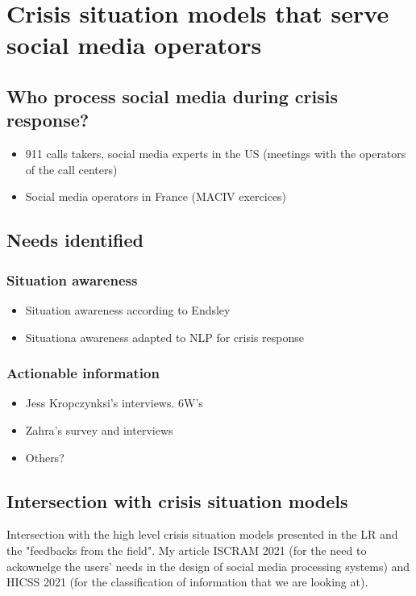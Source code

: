 \chapter{Crisis situation models that serve social media operators}

\section{Who process social media during crisis response?}
\begin{itemize}
    \item 911 calls takers, social media experts in the US (meetings with the operators of the call centers)
    \item Social media operators in France (MACIV exercices)
\end{itemize}

\section{Needs identified}
\subsection{Situation awareness}
\begin{itemize}
    \item Situation awareness according to Endsley
    \item Situationa awareness adapted to NLP for crisis response
\end{itemize}

\subsection{Actionable information}
\begin{itemize}
    \item Jess Kropczynksi's interviews. 6W's
    \item Zahra's survey and interviews
    \item Others?
\end{itemize}

\section{Intersection with crisis situation models}
Intersection with the high level crisis situation models presented in the LR and the "feedbacks from the field".
My article ISCRAM 2021 (for the need to ackownelge the users' needs in the design of social media processing systems) and HICSS 2021 (for the classification of information that we are looking at).

